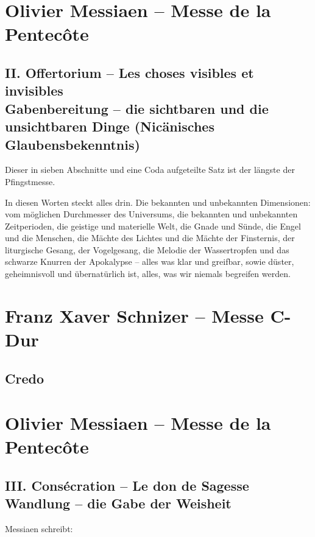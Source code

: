 \documentclass[a5paper,twoside,fontsize=11pt]{scrartcl}
\newcommand{\frenchandgermantitle}[2]{\subsection*{#1 \\#2}}
\begin{document}
\section*{Olivier Messiaen – Messe de la Pentecôte}
\frenchandgermantitle{II. Offertorium – Les choses visibles et invisibles}{Gabenbereitung – die sichtbaren und die unsichtbaren Dinge (Nicänisches Glaubensbekenntnis)}

Dieser in sieben Abschnitte und eine Coda aufgeteilte Satz ist der längste der Pfingstmesse.

In diesen Worten steckt alles drin.
Die bekannten und unbekannten Dimensionen: vom möglichen Durchmesser des Universums, die bekannten und unbekannten Zeitperioden, die geistige und materielle Welt, die Gnade und Sünde, die Engel und die Menschen, die Mächte des Lichtes und die Mächte der Finsternis, der liturgische Gesang, der Vogelgesang, die Melodie der Wassertropfen und das schwarze Knurren der Apokalypse – alles was klar und greifbar, sowie düster, geheimnisvoll und übernatürlich ist, alles, was wir niemals begreifen werden.

\section*{Franz Xaver Schnizer – Messe C-Dur}
\subsection*{Credo}
\begin{Parallel}{0.45\textwidth}{0.5\textwidth}
    \RaggedRight
    
\end{Parallel}
\vspace{\baselineskip}

\section*{Olivier Messiaen – Messe de la Pentecôte}

\frenchandgermantitle{III. Consécration – Le don de Sagesse}{Wandlung – die Gabe der Weisheit}

\medskip

\noindent Messiaen schreibt:
\end{document}
